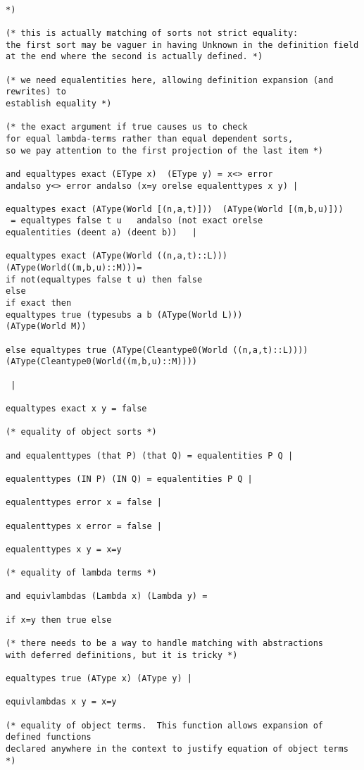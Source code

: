 \documentclass{article}
\begin{document}
\begin{verbatim}

*)

(* this is actually matching of sorts not strict equality:
the first sort may be vaguer in having Unknown in the definition field 
at the end where the second is actually defined. *)

(* we need equalentities here, allowing definition expansion (and rewrites) to
establish equality *)

(* the exact argument if true causes us to check 
for equal lambda-terms rather than equal dependent sorts, 
so we pay attention to the first projection of the last item *)

and equaltypes exact (EType x)  (EType y) = x<> error 
andalso y<> error andalso (x=y orelse equalenttypes x y) |

equaltypes exact (AType(World [(n,a,t)]))  (AType(World [(m,b,u)]))
 = equaltypes false t u   andalso (not exact orelse 
equalentities (deent a) (deent b))   |

equaltypes exact (AType(World ((n,a,t)::L)))(AType(World((m,b,u)::M)))=
if not(equaltypes false t u) then false
else 
if exact then
equaltypes true (typesubs a b (AType(World L)))
(AType(World M))

else equaltypes true (AType(Cleantype0(World ((n,a,t)::L))))(AType(Cleantype0(World((m,b,u)::M))))

 |

equaltypes exact x y = false

(* equality of object sorts *)

and equalenttypes (that P) (that Q) = equalentities P Q |

equalenttypes (IN P) (IN Q) = equalentities P Q |

equalenttypes error x = false |

equalenttypes x error = false |

equalenttypes x y = x=y

(* equality of lambda terms *)

and equivlambdas (Lambda x) (Lambda y) = 

if x=y then true else 

(* there needs to be a way to handle matching with abstractions
with deferred definitions, but it is tricky *)

equaltypes true (AType x) (AType y) |

equivlambdas x y = x=y

(* equality of object terms.  This function allows expansion of defined functions 
declared anywhere in the context to justify equation of object terms *)


\end{verbatim}
\end{document}
